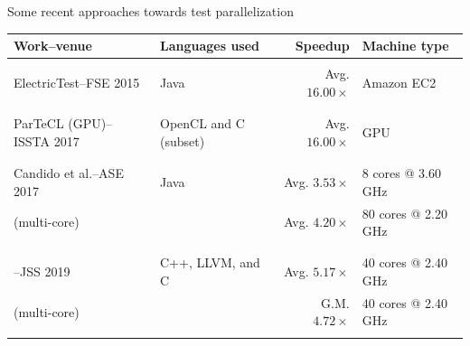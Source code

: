 \documentclass{beamer}
\begin{document}
\begin{frame}{Some recent approaches towards test parallelization}
	\begin{center}
		\fontsize{7.5}{7.5}
		{	
			\selectfont
			\setlength{\tabcolsep}{0.9mm}
			\centering
			\begin{tabular}{l|l|r|l}
				\hline
				{\textbf{Work--venue}} & {\textbf{Languages used}} & {\textbf{Speedup}} & {\textbf{Machine type}}\\
				\hline
				{} & {} & {} & {}\\
				{{\rsm ElectricTest}--FSE 2015} & {\rsm Java} & {Avg. $16.00\times$} & {Amazon EC2}\\
				{} & {} & {} & {}\\
				\hline
				{} & {} & {} & {}\\
				{{\rsm ParTeCL} (GPU)--ISSTA 2017} & {OpenCL and {\rsm C (subset)}} & {Avg. $16.00\times$} & {GPU}\\
				{} & {} & {} & {}\\
				\hline
				{} & {} & {} & {}\\
				{Candido et al.--ASE 2017} & {\rsm Java} & {Avg. $3.53\times$} & {8 cores @ 3.60 GHz}\\
				{({\rsm multi-core})} & {} & {Avg. $4.20\times$} & {80 cores @ 2.20 GHz}\\
				{} & {} & {} & {}\\
				\hline
				{} & {} & {} & {}\\
				{\mahtab--JSS 2019} & {C++, LLVM, and {\rsm C}} & {Avg. $5.17\times$} & {40 cores @ 2.40 GHz}\\
				{({\rsm multi-core})} & {} & {G.M. $4.72\times$} & {40 cores @ 2.40 GHz}\\
				{} & {} & {} & {}\\
				\hline
			\end{tabular}
		}	
	\end{center}
	\centering
\end{frame}
\end{document}
